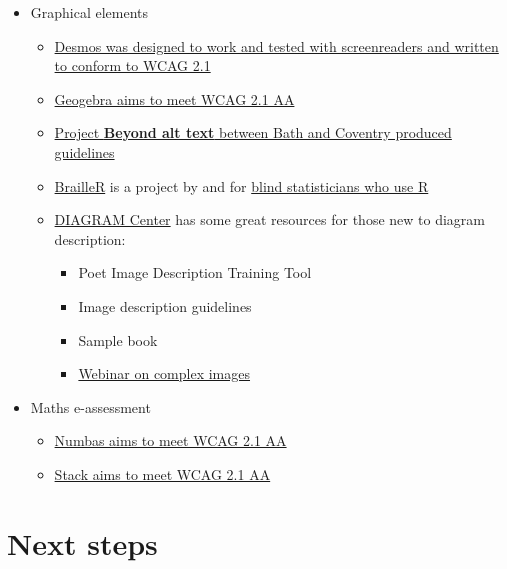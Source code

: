 \documentclass[
  12pt,
  a4-paperpaper,
  DIV=11,
  numbers=noendperiod]{scrartcl}
\providecommand{\tightlist}{%
  \setlength{\itemsep}{0pt}\setlength{\parskip}{0pt}}
\begin{document}
\begin{itemize}
\tightlist
\item
  Graphical elements

  \begin{itemize}
  \tightlist
  \item
    \href{https://www.desmos.com/accessibility}{Desmos was designed to
    work and tested with screenreaders and written to conform to WCAG
    2.1}
  \item
    \href{https://www.geogebra.org/m/r2EF8uRx}{Geogebra aims to meet
    WCAG 2.1 AA}
  \item
    \href{https://bathmash.github.io/CETL-MSOR-2022-Beyond-alt-text/index.html}{Project
    \textbf{Beyond alt text} between Bath and Coventry produced
    guidelines}
  \item
    \href{https://github.com/ajrgodfrey/BrailleR}{BrailleR} is a project
    by and for \href{https://r-resources.massey.ac.nz/BrailleR/}{blind
    statisticians who use R}
  \item
    \href{http://diagramcenter.org/}{DIAGRAM Center} has some great
    resources for those new to diagram description:

    \begin{itemize}
    \tightlist
    \item
      Poet Image Description Training Tool
    \item
      Image description guidelines
    \item
      Sample book
    \item
      \href{http://diagramcenter.org/diagramwebinars.html\#compleximages}{Webinar
      on complex images}
    \end{itemize}
  \end{itemize}
\item
  Maths e-assessment

  \begin{itemize}
  \tightlist
  \item
    \href{https://docs.numbas.org.uk/en/latest/accessibility/editor.html}{Numbas
    aims to meet WCAG 2.1 AA}
  \item
    \href{https://stack-assessment.org/Legal/Accessibility/}{Stack aims
    to meet WCAG 2.1 AA}
  \end{itemize}
\end{itemize}

\section{Next steps}\label{next-steps}
\end{document}
